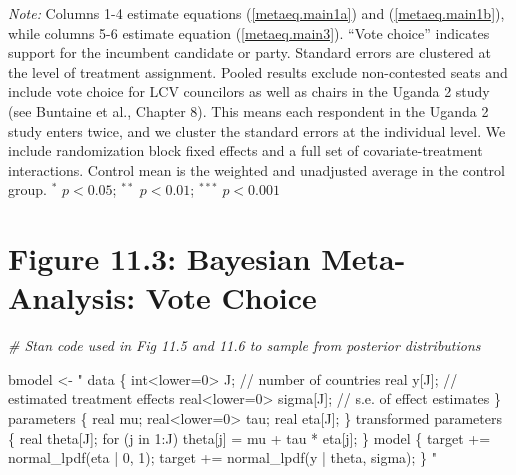 \documentclass[]{article}
\newenvironment{Shaded}{\begin{snugshade}}{\end{snugshade}}
\newcommand{\StringTok}[1]{\textcolor[rgb]{0.31,0.60,0.02}{#1}}
\newcommand{\CommentTok}[1]{\textcolor[rgb]{0.56,0.35,0.01}{\textit{#1}}}
\newcommand{\NormalTok}[1]{#1}
\begin{document}
\begin{table}[!htbp]
\begin{flushleft}\textit{Note:}  Columns 1-4 estimate equations (\ref{metaeq.main1a}) and (\ref{metaeq.main1b}), while columns 5-6 estimate equation (\ref{metaeq.main3}).  ``Vote choice'' indicates support for the incumbent candidate or party. Standard errors are clustered at the level of treatment assignment. Pooled results exclude non-contested seats and include vote choice for LCV councilors as well as chairs in the Uganda 2 study (see Buntaine et al., Chapter 8). This means each respondent in the Uganda 2 study enters twice, and we cluster the standard errors at the individual level. We include randomization block fixed effects and a full set of covariate-treatment interactions. Control mean is the weighted and unadjusted average in the control group. $^*$ $p<0.05$; $^{**}$ $p<0.01$; $^{***}$ $p<0.001$ \end{flushleft}
\end{table}

\clearpage

\section{Figure 11.3: Bayesian Meta-Analysis: Vote
Choice}\label{figure-11.3-bayesian-meta-analysis-vote-choice}

\begin{Shaded}
\begin{Highlighting}[]
\CommentTok{# Stan code used in Fig 11.5 and 11.6 to sample from posterior distributions}

\NormalTok{  bmodel <-}\StringTok{ "}
\StringTok{  data \{}
\StringTok{    int<lower=0> J; // number of countries }
\StringTok{    real y[J]; // estimated treatment effects}
\StringTok{    real<lower=0> sigma[J]; // s.e. of effect estimates }
\StringTok{  \}}
\StringTok{  parameters \{}
\StringTok{    real mu; }
\StringTok{    real<lower=0> tau;}
\StringTok{    real eta[J];}
\StringTok{  \}}
\StringTok{  transformed parameters \{}
\StringTok{    real theta[J];}
\StringTok{    for (j in 1:J)}
\StringTok{      theta[j] = mu + tau * eta[j];}
\StringTok{  \}}
\StringTok{  model \{}
\StringTok{    target += normal_lpdf(eta | 0, 1);}
\StringTok{    target += normal_lpdf(y | theta, sigma);}
\StringTok{  \}}
\StringTok{  "}
\end{Highlighting}
\end{Shaded}
\end{document}
